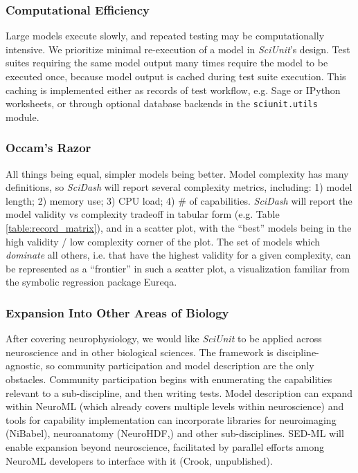 \documentclass[11pt,letterpaper]{article}
\let\verbx\lstinline
\begin{document}
\subsubsection{Computational Efficiency}
Large models execute slowly, and repeated testing may be computationally intensive.  We prioritize minimal re-execution of a model in \textit{SciUnit}'s design.  Test suites requiring the same model output many times require the model to be executed once, because model output is cached during test suite execution.  This caching is implemented either as records of test workflow, e.g. Sage or IPython worksheets, or through optional database backends in the \verbx{sciunit.utils} module.  

\subsubsection{Occam's Razor}
All things being equal, simpler models being better.  Model complexity has many definitions, so \textit{SciDash} will report several complexity metrics\cite{mccabe_complexity_1976}, including: 1) model length; 2) memory use; 3) CPU load; 4) \# of capabilities.  \textit{SciDash} will report the model validity vs complexity tradeoff in tabular form (e.g. Table \ref{table:record_matrix}), and in a scatter plot, with the ``best'' models being in the high validity / low complexity corner of the plot.  The set of models which \textit{dominate} all others, i.e. that have the highest validity for a given complexity, can be represented as a ``frontier'' in such a scatter plot, a visualization familiar from the symbolic regression package Eureqa\cite{schmidt_distilling_2009}.  

\subsubsection{Expansion Into Other Areas of Biology}
After covering neurophysiology, we would like \textit{SciUnit} to be applied across neuroscience and in other biological sciences.  The framework is discipline-agnostic, so community participation and model description are the only obstacles.  Community participation begins with enumerating the capabilities relevant to a sub-discipline, and then writing tests.  Model description can expand within NeuroML (which already covers multiple levels within neuroscience) and tools for capability implementation can incorporate libraries for neuroimaging (NiBabel\cite{nibabel_url}), neuroanatomy (NeuroHDF,\cite{neurohdf_url}) and other sub-disciplines.  SED-ML\cite{hucka_systems_2003,sedml_url} will enable expansion beyond neuroscience, facilitated by parallel efforts among NeuroML developers to interface with it (Crook, unpublished).    
\end{document}
